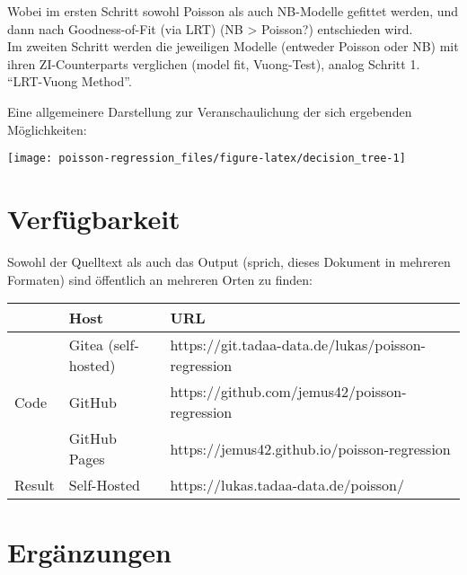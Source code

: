 \documentclass[ngerman,a4paper,]{scrartcl}
\theoremstyle{definition}
\theoremstyle{definition}
\theoremstyle{definition}
\theoremstyle{remark}
\begin{document}
Wobei im ersten Schritt sowohl Poisson als auch NB-Modelle gefittet werden, und dann nach Goodness-of-Fit (via LRT) (NB \textgreater{} Poisson?) entschieden wird.\\
Im zweiten Schritt werden die jeweiligen Modelle (entweder Poisson oder NB) mit ihren ZI-Counterparts verglichen (model fit, Vuong-Test), analog Schritt 1.\\
\enquote{LRT-Vuong Method}.

Eine allgemeinere Darstellung zur Veranschaulichung der sich ergebenden Möglichkeiten:

\begin{center}\texttt{[image: poisson-regression\_files/figure-latex/decision\_tree-1]} \end{center}

\hypertarget{appendix-appendix}{%
\appendix {}}


\hypertarget{verfugbarkeit}{%
\section{Verfügbarkeit}\label{verfugbarkeit}}

Sowohl der Quelltext als auch das Output (sprich, dieses Dokument in mehreren Formaten) sind öffentlich an mehreren Orten zu finden:

\begin{table}[H]
\centering
\begin{tabular}{lll}
\toprule
  & Host & URL\\
\midrule
 & Gitea (self-hosted) & https://git.tadaa-data.de/lukas/poisson-regression\\
\cmidrule{2-3}
\multirow{-2}{*}{\raggedright\arraybackslash Code} & GitHub & https://github.com/jemus42/poisson-regression\\
\cmidrule{1-3}
 & GitHub Pages & https://jemus42.github.io/poisson-regression\\
\cmidrule{2-3}
\multirow{-2}{*}{\raggedright\arraybackslash Result} & Self-Hosted & https://lukas.tadaa-data.de/poisson/\\
\bottomrule
\end{tabular}
\end{table}

\hypertarget{erganzungen}{%
\section{Ergänzungen}\label{erganzungen}}
\end{document}
